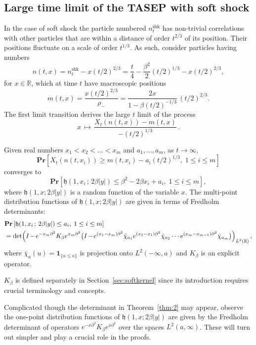 \documentclass[AHL,Unicode,longabstracts]{cedram}
\DeclareMathOperator{\shk}{shk}
\newcommand{\pr}[1]{\mathbf{Pr}\left[#1\right]}
\newcommand{\ind}[1]{\mathbf{1}_{\{ #1 \}}}
\newcommand{\R}{\mathbb{R}}
\newcommand{\h}{\mathfrak{h}}
\newcommand*{\Mk}{\mkern -2mu}
\begin{document}
\subsection{Large time limit of the TASEP with soft shock} In the case of soft shock the particle numbered $n^{\shk}_t$ has non-trivial correlations with other particles that are within a distance of order $t^{2/3}$ of its position. Their positions fluctuate on a scale of order $t^{1/3}$. As such, consider particles having numbers
\[
n(t, x) = n^{\shk}_t - x(t/2)^{2/3} = \frac{t}{4} - \frac{\beta^2}{2}(t/2)^{1/3} - x(t/2)^{2/3},
\]
for $x \in \R$, which at time $t$ have macroscopic positions
\[
m(t,x) = \frac{x (t/2)^{2/3}}{\rho_{-}} = \frac{2x}{1-\beta(t/2)^{-1/3}}\, (t/2)^{2/3}.
\]
The first limit transition derives the large $t$ limit of the process
\begin{equation}\label{eqn:firstlim}
x \, \mapsto \, \frac{X_t(n(t,x)) - m(t,x)}{-(t/2)^{1/3}}\,.
\end{equation}

\begin{theo}\label{thm:2}
Given real numbers $x_1 < x_2 < \dots < x_m$ and $a_1, \dots, a_m$, as $ t \to \infty$,
\[
\pr{ X_t(n(t,x_i)) \geq m(t,x_i) - a_i(t/2)^{1/3},\; 1 \leq i \leq m}
\]
converges to
\[
\pr{ \h(1,x_i \,; \, 2\beta|y|) \leq \beta^2 - 2\beta x_i + a_i, \; 1 \leq i \leq m},
\]
where $\h(1,x; 2\beta|y|)$ is a random function of the variable $x$. The multi-point distribution functions of $\h(1,x; 2\beta |y|)$ are given in terms of Fredholm determinants:
\begin{align*}
& \pr{\h(1,x_i \,;\, 2\beta|y|) \leq a_i,\; 1\leq i \leq m}\\
& =\det\!\left (I \Mk-\Mk e^{-x_m \partial^2}K_{\beta}e^{x_m \partial^2}
\big (I \Mk-\Mk e^{(x_1-x_m)\partial^2}\bar{\chi}_{a_1} e^{(x_2-x_1)\partial^2} \bar{\chi}_{a_2}
\cdots e^{(x_m-x_{m-1})\partial^2}\bar{\chi}_{a_m} \big)\right)_{L^2(\R)},
\end{align*}
where $\bar{\chi}_{a}(u) = \ind{u \leq a}$ is projection onto $L^2(-\infty, a)$ and $K_{\beta}$ is an explicit operator.
\end{theo}
$K_{\beta}$ is defined separately in Section~\ref{sec:softkernel} since its introduction requires crucial terminology and concepts.

Complicated though the determinant in Theorem~\ref{thm:2} may appear, observe the one-point distribution functions of $\h(1,x; 2\beta |y|)$ are given by the Fredholm determinant of operators $e^{-x\partial^2} K_{\beta} e^{x \partial^2}$ over the spaces $L^2(a,\infty)$. These will turn out simpler and play a crucial role in the proofs.
\end{document}
